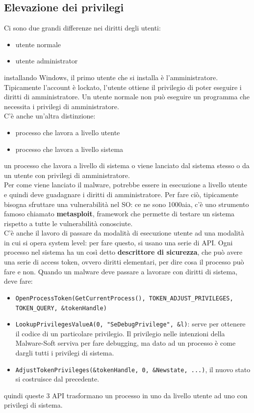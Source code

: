 \documentclass[12pt, oneside]{extbook}
\begin{document}
\subsection{Elevazione dei privilegi}
Ci sono due grandi differenze nei diritti degli utenti:
\begin{itemize}
	\item utente normale
	\item utente administrator
\end{itemize}
installando Windows, il primo utente che si installa è l'amministratore. Tipicamente l'account è lockato, l'utente ottiene il privilegio di poter eseguire i diritti di amministratore. Un utente normale non può eseguire un programma che necessita i privilegi di amministratore.\\C'è anche un'altra distinzione:
\begin{itemize}
	\item processo che lavora a livello utente
	\item processo che lavora a livello sistema
\end{itemize}
un processo che lavora a livello di sistema o viene lanciato dal sistema stesso o da un utente con privilegi di amministratore.\\Per come viene lanciato il malware, potrebbe essere in esecuzione a livello utente e quindi deve guadagnare i diritti di amministratore. Per fare ciò, tipicamente bisogna sfruttare una vulnerabilità nel SO: ce ne sono 1000aia, c'è uno strumento famoso chiamato \textbf{metasploit}, framework che permette di testare un sistema rispetto a tutte le vulnerabilità conosciute.\\C'è anche il lavoro di passare da modalità di esecuzione utente ad una modalità in cui si opera system level: per fare questo, si usano una serie di API. Ogni processo nel sistema ha un così detto \textbf{descrittore di sicurezza}, che può avere una serie di access token, ovvero diritti elementari, per dire cosa il processo può fare e non. Quando un malware deve passare a lavorare con diritti di sistema, deve fare:
\begin{itemize}
	\item \texttt{OpenProcessToken(GetCurrentProcess(), TOKEN\_ADJUST\_PRIVILEGES, TOKEN\_QUERY, \&tokenHandle)}
	\item \texttt{LookupPrivilegesValueA(0, "SeDebugPrivilege", \&l)}: serve per ottenere il codice di un particolare privilegio. Il privilegio nelle intenzioni della Malware-Soft serviva per fare debugging, ma dato ad un processo è come dargli tutti i privilegi di sistema.
	\item \texttt{AdjustTokenPrivileges(\&tokenHandle, 0, \&Newstate, ...)}, il nuovo stato si costruisce dal precedente.
\end{itemize}
quindi queste 3 API trasformano un processo in uno da livello utente ad uno con privilegi di sistema.
\end{document}
